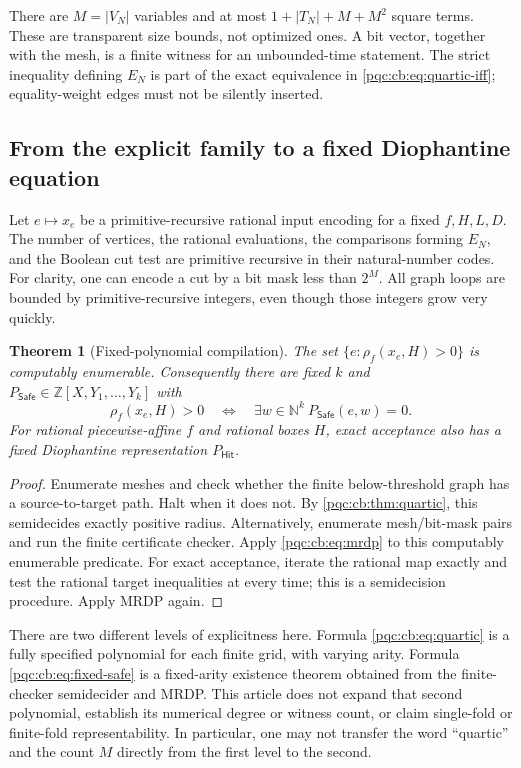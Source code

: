 \documentclass[11pt,letterpaper]{article}
\numberwithin{equation}{section}
\newtheorem{theorem}{Theorem}[section]
\theoremstyle{definition}
\theoremstyle{remark}
\newcommand{\N}{\mathbb N}
\newcommand{\Z}{\mathbb Z}
\newcommand{\Hit}{\mathsf{Hit}}
\newcommand{\Safe}{\mathsf{Safe}}
\newcommand{\cenum}{computably enumerable}
\newcommand{\PWA}{piecewise-affine}
\begin{document}
There are $M=|V_N|$ variables and at most $1+|T_N|+M+M^2$ square terms.
These are transparent size bounds, not optimized ones.  A bit vector, together
with the mesh, is a finite witness for an unbounded-time statement.
The strict inequality defining $E_N$ is part of the exact equivalence in
\eqref{pqc:cb:eq:quartic-iff}; equality-weight edges must not be silently inserted.

\subsection{From the explicit family to a fixed Diophantine equation}

Let $e\mapsto x_e$ be a primitive-recursive rational input encoding for a fixed
$f,H,L,D$.  The number of vertices, the rational evaluations, the comparisons
forming $E_N$, and the Boolean cut test are primitive recursive in their
natural-number codes.  For clarity, one can encode a cut by a bit mask less
than $2^M$.  All graph loops are bounded by primitive-recursive integers, even
though those integers grow very quickly.

\begin{theorem}[Fixed-polynomial compilation]
\label{pqc:cb:thm:fixed-poly}
The set $\{e:\rho_f(x_e,H)>0\}$ is \cenum.  Consequently there are fixed $k$ and
$P_{\Safe}\in\Z[X,Y_1,\ldots,Y_k]$ with
\begin{equation}
 \rho_f(x_e,H)>0\quad\Longleftrightarrow\quad
 \exists w\in\N^k\ P_{\Safe}(e,w)=0.
 \label{pqc:cb:eq:fixed-safe}
\end{equation}
For rational \PWA{} $f$ and rational boxes $H$, exact acceptance also has a
fixed Diophantine representation $P_{\Hit}$.
\end{theorem}
\begin{proof}
Enumerate meshes and check whether the finite below-threshold graph has a
source-to-target path.  Halt when it does not.  By \cref{pqc:cb:thm:quartic}, this
semidecides exactly positive radius.  Alternatively, enumerate mesh/bit-mask
pairs and run the finite certificate checker.  Apply \eqref{pqc:cb:eq:mrdp} to this
\cenum{} predicate.  For exact acceptance, iterate the rational map exactly and
test the rational target inequalities at every time; this is a semidecision
procedure.  Apply MRDP again.
\end{proof}

There are two different levels of explicitness here.  Formula
\eqref{pqc:cb:eq:quartic} is a fully specified polynomial for each finite grid, with
varying arity.  Formula \eqref{pqc:cb:eq:fixed-safe} is a fixed-arity existence theorem
obtained from the finite-checker semidecider and MRDP.  This article does not
expand that second polynomial, establish its numerical degree or witness
count, or claim single-fold or finite-fold representability.  In particular,
one may not transfer the word ``quartic'' and the count $M$ directly from the
first level to the second.
\end{document}
